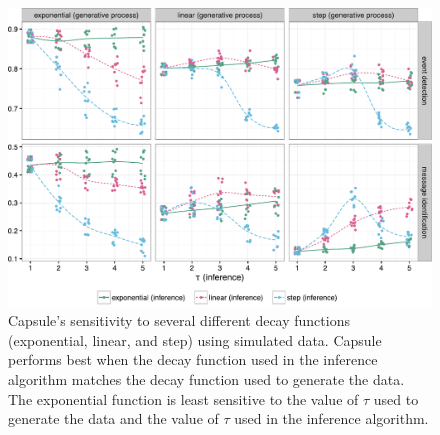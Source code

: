 \begin{figure}[ht]
\centering
\includegraphics[width=\linewidth]{fig/sim_sensitivity.pdf}
\caption{Capsule's sensitivity to several different decay functions
(exponential, linear, and step) using simulated data. Capsule performs
best when the decay function used in the inference algorithm matches
the decay function used to generate the data. The exponential function
is least sensitive to the value of $\tau$ used to generate the data
and the value of $\tau$ used in the inference algorithm.}
\label{fig:sensitivity}
\end{figure}
